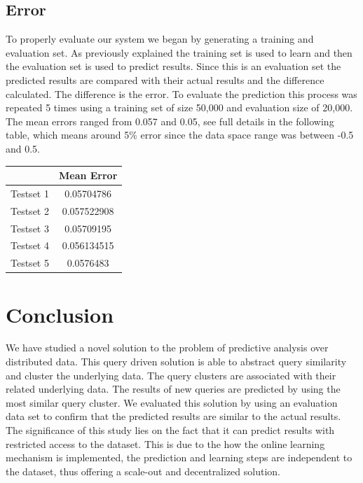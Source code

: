 \documentclass{lmproj}
\begin{document}
\section{Error}
To properly evaluate our system we began by generating a training and evaluation set. As previously explained the training set is used to learn and then the evaluation set is used to predict results. Since this is an evaluation set the predicted results are compared with their actual results and the difference calculated. The difference is the error. To evaluate the prediction this process was repeated 5 times using a training set of size 50,000 and evaluation size of 20,000. The mean errors ranged from 0.057 and 0.05, see full details in the following table, which means around 5\% error since the data space range was between -0.5 and 0.5.

\begin{center}
 \label{table7}
\begin{tabular}{|c|c|}
	\hline   & Mean Error \\ 
	\hline Testset 1 & 0.05704786  \\ 
    \hline Testset 2 & 0.057522908   \\ 
	\hline Testset 3 & 0.05709195   \\ 
	\hline Testset 4 & 0.056134515   \\ 
	\hline Testset 5 & 0.0576483
   \\ 
	\hline
\end{tabular}
\end{center}

\chapter{Conclusion}
We have studied a novel solution to the problem of predictive analysis over distributed data. This query driven solution is able to abstract query similarity and cluster the underlying data. The query clusters are associated with their related underlying data. The results of new queries are predicted by using the most similar query cluster. We evaluated this solution by using an evaluation data set to confirm that the predicted results are similar to the actual results. The significance of this study lies on the fact that it can predict results with restricted access to the dataset. This is due to the how the online learning mechanism is implemented, the prediction and learning steps are independent to the dataset, thus offering a scale-out and decentralized solution. 
\end{document}
